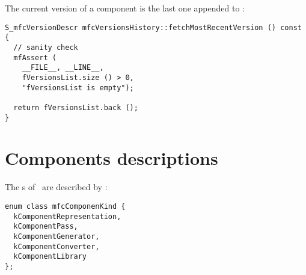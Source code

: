 The current version of a component is the last one appended to :
\begin{lstlisting}[language=CPlusPlus]
S_mfcVersionDescr mfcVersionsHistory::fetchMostRecentVersion () const
{
  // sanity check
  mfAssert (
    __FILE__, __LINE__,
    fVersionsList.size () > 0,
    "fVersionsList is empty");

  return fVersionsList.back ();
}
\end{lstlisting}


\section{Components descriptions}\label{Components descriptions}

The \component s of \mf\ are described by :
\begin{lstlisting}[language=CPlusPlus]
enum class mfcComponenKind {
  kComponentRepresentation,
  kComponentPass,
  kComponentGenerator,
  kComponentConverter,
  kComponentLibrary
};
\end{lstlisting}

